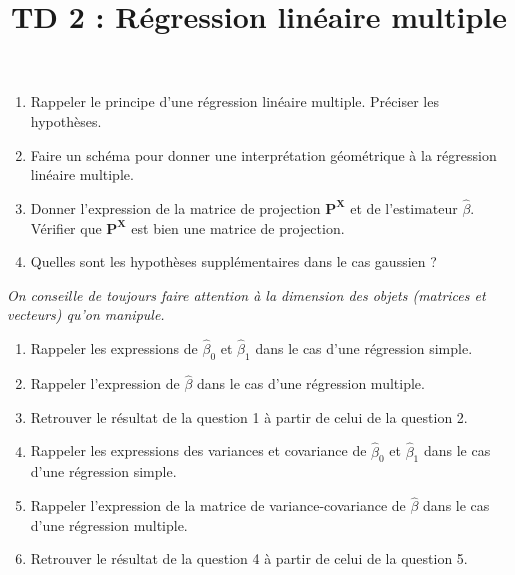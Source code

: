 \documentclass{../headers/td_upc}
\title{TD 2 : Régression linéaire multiple}
\providecommand{\1}{\mathds{1}}
\begin{document}
	\maketitle
	
	
	
	\begin{enumerate}
		\item Rappeler le principe d'une régression linéaire multiple. Préciser les hypothèses.
		\item Faire un schéma pour donner une interprétation géométrique à la régression linéaire multiple.
		\item Donner l'expression de la matrice de projection $\mathbf{P}^{\mathbf{X}}$ et de l'estimateur $\hat \beta$. Vérifier que $\mathbf{P}^{\mathbf{X}}$ est bien une matrice de projection.
		\item Quelles sont les hypothèses supplémentaires dans le cas gaussien ?
	\end{enumerate}
	\textit{On conseille de toujours faire attention à la dimension des objets (matrices et vecteurs) qu'on manipule.}
	
	
	\begin{enumerate}
		\item Rappeler les expressions de $\hat \beta_0$ et $\hat \beta_1$ dans le cas d'une régression simple.
		\item Rappeler l'expression de $\hat \beta$ dans le cas d'une régression multiple.
		\item Retrouver le résultat de la question 1 à partir de celui de la question 2.
		\item Rappeler les expressions des variances et covariance de $\hat \beta_0$ et $\hat \beta_1$ dans le cas d'une régression simple.
		\item Rappeler l'expression de la matrice de variance-covariance de $\hat \beta$ dans le cas d'une régression multiple.
		\item Retrouver le résultat de la question 4 à partir de celui de la question 5.
	\end{enumerate}

	\cor{\newpage}
\end{document}
